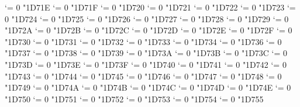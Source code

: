 {  \Umathcode `\Γ = 0 \unimathfam "1D71E
  \Umathcode `\Δ = 0 \unimathfam "1D71F
  \Umathcode `\Ε = 0 \unimathfam "1D720
  \Umathcode `\Ζ = 0 \unimathfam "1D721
  \Umathcode `\Η = 0 \unimathfam "1D722
  \Umathcode `\Θ = 0 \unimathfam "1D723
  \Umathcode `\Ι = 0 \unimathfam "1D724
  \Umathcode `\Κ = 0 \unimathfam "1D725
  \Umathcode `\Λ = 0 \unimathfam "1D726
  \Umathcode `\Μ = 0 \unimathfam "1D727
  \Umathcode `\Ν = 0 \unimathfam "1D728
  \Umathcode `\Ξ = 0 \unimathfam "1D729
  \Umathcode `\Ο = 0 \unimathfam "1D72A
  \Umathcode `\Π = 0 \unimathfam "1D72B
  \Umathcode `\Ρ = 0 \unimathfam "1D72C
  \Umathcode `\ϴ = 0 \unimathfam "1D72D
  \Umathcode `\Σ = 0 \unimathfam "1D72E
  \Umathcode `\Τ = 0 \unimathfam "1D72F
  \Umathcode `\Υ = 0 \unimathfam "1D730
  \Umathcode `\Φ = 0 \unimathfam "1D731
  \Umathcode `\Χ = 0 \unimathfam "1D732
  \Umathcode `\Ψ = 0 \unimathfam "1D733
  \Umathcode `\Ω = 0 \unimathfam "1D734
  \Umathcode `\α = 0 \unimathfam "1D736
  \Umathcode `\β = 0 \unimathfam "1D737
  \Umathcode `\γ = 0 \unimathfam "1D738
  \Umathcode `\δ = 0 \unimathfam "1D739
  \Umathcode `\ε = 0 \unimathfam "1D73A
  \Umathcode `\ζ = 0 \unimathfam "1D73B
  \Umathcode `\η = 0 \unimathfam "1D73C
  \Umathcode `\θ = 0 \unimathfam "1D73D
  \Umathcode `\ι = 0 \unimathfam "1D73E
  \Umathcode `\κ = 0 \unimathfam "1D73F
  \Umathcode `\λ = 0 \unimathfam "1D740
  \Umathcode `\μ = 0 \unimathfam "1D741
  \Umathcode `\ν = 0 \unimathfam "1D742
  \Umathcode `\ξ = 0 \unimathfam "1D743
  \Umathcode `\ο = 0 \unimathfam "1D744
  \Umathcode `\π = 0 \unimathfam "1D745
  \Umathcode `\ρ = 0 \unimathfam "1D746
  \Umathcode `\ς = 0 \unimathfam "1D747
  \Umathcode `\σ = 0 \unimathfam "1D748
  \Umathcode `\τ = 0 \unimathfam "1D749
  \Umathcode `\υ = 0 \unimathfam "1D74A
  \Umathcode `\ϕ = 0 \unimathfam "1D74B
  \Umathcode `\χ = 0 \unimathfam "1D74C
  \Umathcode `\ψ = 0 \unimathfam "1D74D
  \Umathcode `\ω = 0 \unimathfam "1D74E
  \Umathcode `\ϵ = 0 \unimathfam "1D750
  \Umathcode `\ϑ = 0 \unimathfam "1D751
  \Umathcode `\ϰ = 0 \unimathfam "1D752
  \Umathcode `\φ = 0 \unimathfam "1D753
  \Umathcode `\ϱ = 0 \unimathfam "1D754
  \Umathcode `\ϖ = 0 \unimathfam "1D755
\tenbfit}
\let\itbf=\bfit

